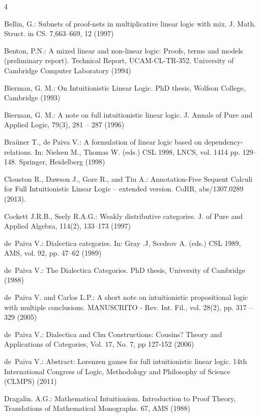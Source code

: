 \documentclass{elsarticle}
\begin{document}
\begin{thebibliography}{4}

 Bellin, G.: Subnets of proof-nets in
  multiplicative linear logic with mix. J. Math. Struct. in
  CS. 7,663--669, 12 (1997)

 Benton, P.N.: A mixed linear and non-linear
  logic: Proofs, terms and models (preliminary report). Technical
  Report, UCAM-CL-TR-352, University of Cambridge Computer Laboratory
  (1994)

 Bierman, G. M.: On Intuitionistic Linear
  Logic. PhD thesis, Wolfson College, Cambridge (1993)

 Bierman, G. M.: A note on full intuitionistic
  linear logic.  J. Annals of Pure and Applied Logic, 79(3), 281 --
  287 (1996)

 Bra\"uner T., de Paiva V.: A formulation of
  linear logic based on dependency-relations. In: Nielsen M., Thomas
  W. (eds.) CSL 1998, LNCS, vol. 1414 pp. 129--148. Springer,
  Heidelberg (1998)

 Clouston R., Dawson J., Gore R., and Tiu A.:
  Annotation-Free Sequent Calculi for Full Intuitionistic Linear Logic
  -- extended version. CoRR, abs/1307.0289 (2013).

 Cockett J.R.B., Seely R.A.G.: Weakly
  distributive categories. J. of Pure and Applied Algebra, 114(2),
  133--173 (1997)

 de~Paiva V.: Dialectica categories. In: Gray
  .J, Scedrov A. (eds.)  CSL 1989, AMS, vol. 92, pp. 47--62 (1989)
  
 de~Paiva V.: The Dialectica Categories. PhD
  thesis, University of Cambridge (1988)

 de~Paiva V. and Carlos L.P.: A short note on
  intuitionistic propositional logic with multiple conclusions.
  MANUSCRITO - Rev. Int. Fil., vol. 28(2), pp. 317 -- 329 (2005)

 de~Paiva V.: Dialectica and Chu Constructions:
  Cousins?  Theory and Applications of Categories, Vol. 17, No. 7, pp
  127-152 (2006)
  
 de~Paiva V.: Abstract: Lorenzen games for full
  intuitionistic linear logic. 14th International Congress of Logic,
  Methodology and Philosophy of Science (CLMPS) (2011)

 Dragalin. A.G.: Mathematical Intuitionism. Introduction to Proof Theory,
  Translations of Mathematical Monographs. 67, AMS (1988)


\end{thebibliography}
\end{document}
